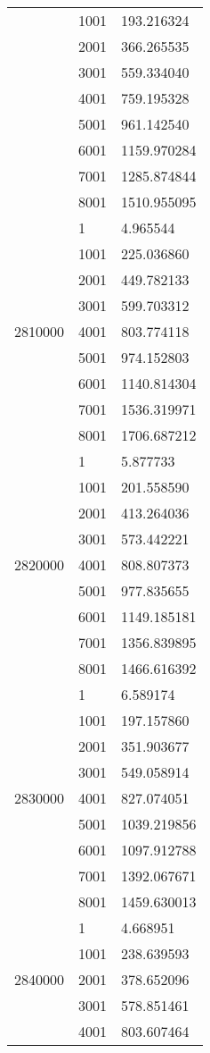 \begin{table}[htb!]
\begin{tabular}{lll}
 & 1001 & 193.216324 \\
 & 2001 & 366.265535 \\
 & 3001 & 559.334040 \\
 & 4001 & 759.195328 \\
 & 5001 & 961.142540 \\
 & 6001 & 1159.970284 \\
 & 7001 & 1285.874844 \\
 & 8001 & 1510.955095 \\
\multirow[c]{9}{*}{2810000} & 1 & 4.965544 \\
 & 1001 & 225.036860 \\
 & 2001 & 449.782133 \\
 & 3001 & 599.703312 \\
 & 4001 & 803.774118 \\
 & 5001 & 974.152803 \\
 & 6001 & 1140.814304 \\
 & 7001 & 1536.319971 \\
 & 8001 & 1706.687212 \\
\multirow[c]{9}{*}{2820000} & 1 & 5.877733 \\
 & 1001 & 201.558590 \\
 & 2001 & 413.264036 \\
 & 3001 & 573.442221 \\
 & 4001 & 808.807373 \\
 & 5001 & 977.835655 \\
 & 6001 & 1149.185181 \\
 & 7001 & 1356.839895 \\
 & 8001 & 1466.616392 \\
\multirow[c]{9}{*}{2830000} & 1 & 6.589174 \\
 & 1001 & 197.157860 \\
 & 2001 & 351.903677 \\
 & 3001 & 549.058914 \\
 & 4001 & 827.074051 \\
 & 5001 & 1039.219856 \\
 & 6001 & 1097.912788 \\
 & 7001 & 1392.067671 \\
 & 8001 & 1459.630013 \\
\multirow[c]{9}{*}{2840000} & 1 & 4.668951 \\
 & 1001 & 238.639593 \\
 & 2001 & 378.652096 \\
 & 3001 & 578.851461 \\
 & 4001 & 803.607464 \\

\end{tabular}
\end{table}
